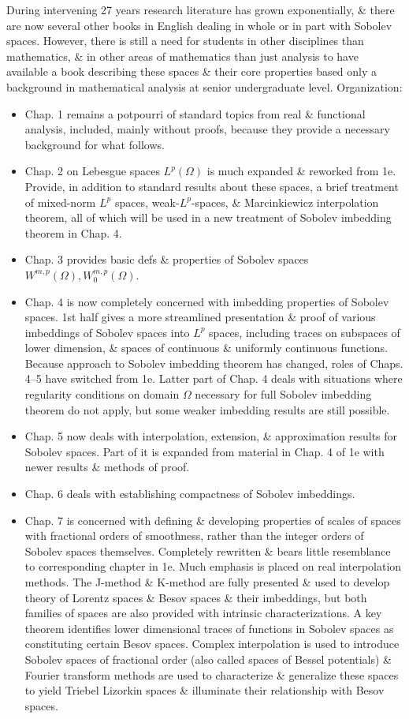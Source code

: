 \documentclass{article}
\begin{document}
\begin{enumerate}
	During intervening 27 years research literature has grown exponentially, \& there are now several other books in English dealing in whole or in part with Sobolev spaces. However, there is still a need for students in other disciplines than mathematics, \& in other areas of mathematics than just analysis to have available a book describing these spaces \& their core properties based only a background in mathematical analysis at senior undergraduate level. Organization:
	\begin{itemize}
		\item Chap. 1 remains a potpourri of standard topics from real \& functional analysis, included, mainly without proofs, because they provide a necessary background for what follows.
		\item Chap. 2 on Lebesgue spaces $L^p(\Omega)$ is much expanded \& reworked from 1e. Provide, in addition to standard results about these spaces, a brief treatment of mixed-norm $L^p$ spaces, weak-$L^p$-spaces, \& Marcinkiewicz interpolation theorem, all of which will be used in a new treatment of Sobolev imbedding theorem in Chap. 4.
		\item Chap. 3 provides basic defs \& properties of Sobolev spaces $W^{m,p}(\Omega),W_0^{m,p}(\Omega)$.
		\item Chap. 4 is now completely concerned with imbedding properties of Sobolev spaces. 1st half gives a more streamlined presentation \& proof of various imbeddings of Sobolev spaces into $L^p$ spaces, including traces on subspaces of lower dimension, \& spaces of continuous \& uniformly continuous functions. Because approach to Sobolev imbedding theorem has changed, roles of Chaps. 4--5 have switched from 1e. Latter part of Chap. 4 deals with situations where regularity conditions on domain $\Omega$ necessary for full Sobolev imbedding theorem do not apply, but some weaker imbedding results are still possible.
		\item Chap. 5 now deals with interpolation, extension, \& approximation results for Sobolev spaces. Part of it is expanded from material in Chap. 4 of 1e with newer results \& methods of proof.
		\item Chap. 6 deals with establishing compactness of Sobolev imbeddings.
		\item Chap. 7 is concerned with defining \& developing properties of scales of spaces with fractional orders of smoothness, rather than the integer orders of Sobolev spaces themselves. Completely rewritten \& bears little resemblance to corresponding chapter in 1e. Much emphasis is placed on real interpolation methods. The J-method \& K-method are fully presented \& used to develop theory of Lorentz spaces \& Besov spaces \& their imbeddings, but both families of spaces are also provided with intrinsic characterizations. A key theorem identifies lower dimensional traces of functions in Sobolev spaces as constituting certain Besov spaces. Complex interpolation is used to introduce Sobolev spaces of fractional order (also called spaces of Bessel potentials) \& Fourier transform methods are used to characterize \& generalize these spaces to yield Triebel Lizorkin spaces \& illuminate their relationship with Besov spaces.

\end{itemize}
\end{enumerate}
\end{document}
